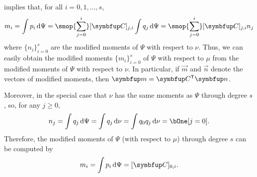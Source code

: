      implies that, for all \( i = 0,1, \ldots, s \),
    \begin{equation*}
        m_i =
        \int p_i \,\d\Psi
        = 
        \smop{\sum_{j=0}^{i}} [\vec{C}]_{j,i} \int q_j \,\d\Psi
        =
        \smop{\sum_{j=0}^{i}} [\vec{C}]_{j,i} n_j
    \end{equation*}
    where \( \{n_i\}_{i=0}^{s} \) are the modified moments of \( \Psi \) with respect to \( \nu \).
    Thus, we can easily obtain the modified moments \( \{ m_i \}_{i=0}^{s} \) of \( \Psi \) with respect to \( \mu \) from the modified moments of \( \Psi \) with respect to \( \nu \).
    In particular, if \( \vec{m} \) and \( \vec{n} \) denote the vectors of modified moments, then \( \vec{m} = \vec{C}^\rT \vec{n} \).

    Moreover, in the special case that \( \nu \) has the same moments as \( \Psi \) through degree \( s \), so, for any \( j\geq 0 \), 
    \begin{equation*}
        n_j = \int q_j \,\d\Psi 
        = \int q_j \,\d\nu
        = \int q_0 q_j \,\d\nu 
        = \bOne[j = 0] .
    \end{equation*}
    Therefore, the modified moments of \( \Psi \) (with respect to \( \mu \)) through degree \( s \) can be computed by
    \begin{equation*}
        m_i=
        \int p_i \,\d\Psi = 
        [ \vec{C}]_{0,i}.
    \end{equation*}

